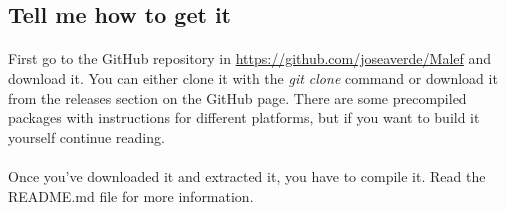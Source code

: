    \subsection{Tell me how to get it}
   \paragraph{}
      First go to the GitHub repository in
   \url{https://github.com/joseaverde/Malef} and download it. You can either
   clone it with the \textit {git clone} command or download it from the
   releases section on the GitHub page. There are some precompiled packages
   with instructions for different platforms, but if you want to build it
   yourself continue reading.

   \paragraph{}
      Once you've downloaded it and extracted it, you have to compile it.
   Read the README.md file for more information.


